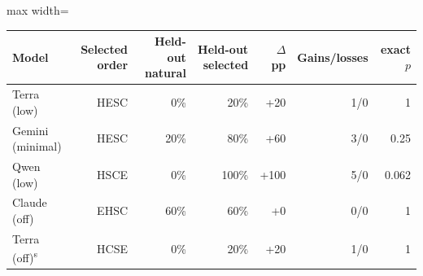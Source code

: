 \begin{adjustbox}{max width=\linewidth}
\begin{tabular}{@{}lrrrrrr@{}}
\toprule
Model & Selected order & Held-out natural & Held-out selected & $\Delta$ pp & Gains/losses & exact $p$ \\
\midrule
Terra (low) & HESC & 0\% & 20\% & +20 & 1/0 & 1 \\
Gemini (minimal) & HESC & 20\% & 80\% & +60 & 3/0 & 0.25 \\
Qwen (low) & HSCE & 0\% & 100\% & +100 & 5/0 & 0.062 \\
Claude (off) & EHSC & 60\% & 60\% & +0 & 0/0 & 1 \\
Terra (off)\textsuperscript{s} & HCSE & 0\% & 20\% & +20 & 1/0 & 1 \\
\bottomrule
\end{tabular}
\end{adjustbox}

\par{}
